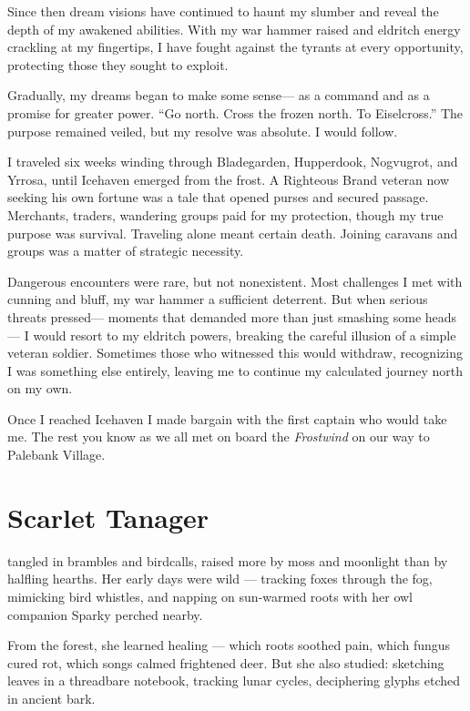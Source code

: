 \documentclass[
  letterpaper,12pt,twoside,twocolumn,openany,
  nodeprecatedcode,bg=full]{dndbook}
\begin{document}
Since then dream visions have continued to haunt my slumber and reveal
the depth of my awakened abilities. With my war hammer raised and
eldritch energy crackling at my fingertips, I have fought against the
tyrants at every opportunity, protecting those they sought to exploit.

Gradually, my dreams began to make some sense--- as a command and as a
promise for greater power. ``Go north. Cross the frozen north. To
Eiselcross.'' The purpose remained veiled, but my resolve was absolute.
I would follow.

I traveled six weeks winding through Bladegarden, Hupperdook, Nogvugrot,
and Yrrosa, until Icehaven emerged from the frost. A Righteous Brand
veteran now seeking his own fortune was a tale that opened purses and
secured passage. Merchants, traders, wandering groups paid for my
protection, though my true purpose was survival. Traveling alone meant
certain death. Joining caravans and groups was a matter of strategic
necessity.

Dangerous encounters were rare, but not nonexistent. Most challenges I
met with cunning and bluff, my war hammer a sufficient deterrent. But
when serious threats pressed--- moments that demanded more than just
smashing some heads--- I would resort to my eldritch powers, breaking
the careful illusion of a simple veteran soldier. Sometimes those who
witnessed this would withdraw, recognizing I was something else
entirely, leaving me to continue my calculated journey north on my own.

Once I reached Icehaven I made bargain with the first captain who would
take me. The rest you know as we all met on board the \emph{Frostwind}
on our way to Palebank Village.

\chapter{Scarlet Tanager}\label{scarlet-tanager}

\hfill\break tangled in
brambles and birdcalls, raised more by moss and moonlight than by
halfling hearths. Her early days were wild --- tracking foxes through
the fog, mimicking bird whistles, and napping on sun-warmed roots with
her owl companion Sparky perched nearby.

From the forest, she learned healing --- which roots soothed pain, which
fungus cured rot, which songs calmed frightened deer. But she also
studied: sketching leaves in a threadbare notebook, tracking lunar
cycles, deciphering glyphs etched in ancient bark.
\end{document}
